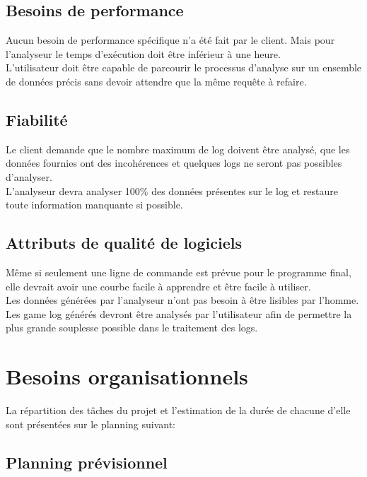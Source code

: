 \subsection{Besoins de performance}

Aucun besoin de performance spécifique n’a été fait par le client. Mais pour l'analyseur le temps d’exécution  doit être inférieur à une heure.\\
L'utilisateur doit être capable de parcourir le processus d'analyse sur un ensemble de données précis sans devoir attendre que la même requête à refaire.

\subsection{Fiabilité}

Le client demande que le nombre maximum de log doivent être analysé, que les données fournies ont des incohérences et quelques logs ne seront pas possibles d'analyser.\\
L'analyseur devra analyser 100\% des données présentes sur le log et restaure toute information manquante si possible.\\
\subsection{Attributs de qualité de logiciels}

Même si seulement une ligne de commande est prévue pour le programme final, elle devrait avoir une courbe facile à apprendre et être facile à utiliser.\\
Les données générées par l'analyseur n’ont pas besoin à être lisibles par l'homme.\\
Les game log générés devront être analysés par l'utilisateur afin de permettre la plus grande souplesse possible dans le traitement des logs.

\section{Besoins organisationnels}

La répartition des tâches du projet et l'estimation de la durée de chacune d'elle sont présentées sur le planning suivant:\\

\subsection{Planning prévisionnel}

